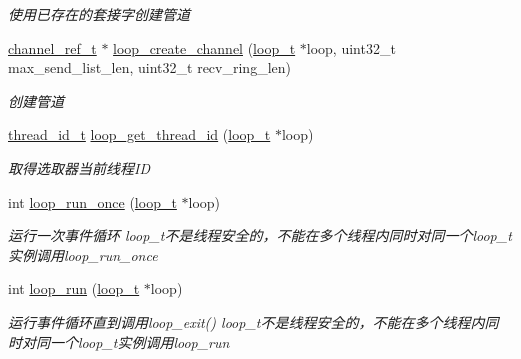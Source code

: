 \begin{DoxyCompactItemize}
\begin{DoxyCompactList}\small\item\em 使用已存在的套接字创建管道 \end{DoxyCompactList}\item 
\hyperlink{a00050_a151271c9d188ef28d4d24bb81dcc1263_a151271c9d188ef28d4d24bb81dcc1263}{channel\+\_\+ref\+\_\+t} $\ast$ \hyperlink{a00104_gab5b73ea9a0347b431f93ebf30ecd05b5_gab5b73ea9a0347b431f93ebf30ecd05b5}{loop\+\_\+create\+\_\+channel} (\hyperlink{a00050_a9c3ad1cd2de83e09f3a7b59fa82c94ee_a9c3ad1cd2de83e09f3a7b59fa82c94ee}{loop\+\_\+t} $\ast$loop, uint32\+\_\+t max\+\_\+send\+\_\+list\+\_\+len, uint32\+\_\+t recv\+\_\+ring\+\_\+len)
\begin{DoxyCompactList}\small\item\em 创建管道 \end{DoxyCompactList}\item 
\hyperlink{a00050_ad0ada5642d10ce71bdd90816182f9b79_ad0ada5642d10ce71bdd90816182f9b79}{thread\+\_\+id\+\_\+t} \hyperlink{a00068_a1a9b3ef7cb2655dbabeabeeae2f8f299_a1a9b3ef7cb2655dbabeabeeae2f8f299}{loop\+\_\+get\+\_\+thread\+\_\+id} (\hyperlink{a00050_a9c3ad1cd2de83e09f3a7b59fa82c94ee_a9c3ad1cd2de83e09f3a7b59fa82c94ee}{loop\+\_\+t} $\ast$loop)
\begin{DoxyCompactList}\small\item\em 取得选取器当前线程\+I\+D \end{DoxyCompactList}\item 
int \hyperlink{a00104_ga2f1994d76e46cf4855ac955ccd41d9ef_ga2f1994d76e46cf4855ac955ccd41d9ef}{loop\+\_\+run\+\_\+once} (\hyperlink{a00050_a9c3ad1cd2de83e09f3a7b59fa82c94ee_a9c3ad1cd2de83e09f3a7b59fa82c94ee}{loop\+\_\+t} $\ast$loop)
\begin{DoxyCompactList}\small\item\em 运行一次事件循环 loop\+\_\+t不是线程安全的，不能在多个线程内同时对同一个loop\+\_\+t实例调用loop\+\_\+run\+\_\+once \end{DoxyCompactList}\item 
int \hyperlink{a00104_ga8eb0f6c8d398c70fc5ca2292664a1187_ga8eb0f6c8d398c70fc5ca2292664a1187}{loop\+\_\+run} (\hyperlink{a00050_a9c3ad1cd2de83e09f3a7b59fa82c94ee_a9c3ad1cd2de83e09f3a7b59fa82c94ee}{loop\+\_\+t} $\ast$loop)
\begin{DoxyCompactList}\small\item\em 运行事件循环直到调用loop\+\_\+exit() loop\+\_\+t不是线程安全的，不能在多个线程内同时对同一个loop\+\_\+t实例调用loop\+\_\+run \end{DoxyCompactList}\item 

\end{DoxyCompactItemize}
